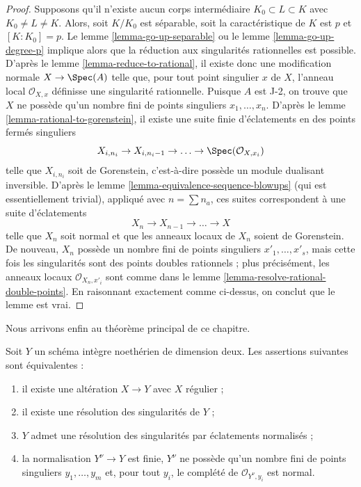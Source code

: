 \begin{proof}
\medskip\noindent Supposons qu'il n'existe aucun corps intermédiaire $K_0 \subset L \subset K$ avec $K_0 \not = L \not = K$. Alors, soit $K/K_0$ est séparable, soit la caractéristique de $K$ est $p$ et $[K : K_0] = p$. Le lemme \ref{lemma-go-up-separable} ou le lemme \ref{lemma-go-up-degree-p} implique alors que la réduction aux singularités rationnelles est possible. D'après le lemme \ref{lemma-reduce-to-rational}, il existe donc une modification normale $X \to \Spec(A)$ telle que, pour tout point singulier $x$ de $X$, l'anneau local $\mathcal{O}_{X, x}$ définisse une singularité rationnelle. Puisque $A$ est J-2, on trouve que $X$ ne possède qu'un nombre fini de points singuliers $x_1, \ldots, x_n$. D'après le lemme \ref{lemma-rational-to-gorenstein}, il existe une suite finie d'éclatements en des points fermés singuliers $$
X_{i, n_i} \to X_{i, n_i - 1} \to \ldots \to \Spec(\mathcal{O}_{X, x_i})
$$ telle que $X_{i, n_i}$ soit de Gorenstein, c'est-à-dire possède un module dualisant inversible. D'après le lemme \ref{lemma-equivalence-sequence-blowups} (qui est essentiellement trivial), appliqué avec $n = \sum n_a$, ces suites correspondent à une suite d'éclatements $$
X_n \to X_{n - 1} \to \ldots \to X
$$ telle que $X_n$ soit normal et que les anneaux locaux de $X_n$ soient de Gorenstein. De nouveau, $X_n$ possède un nombre fini de points singuliers $x'_1, \ldots, x'_s$, mais cette fois les singularités sont des points doubles rationnels ; plus précisément, les anneaux locaux $\mathcal{O}_{X_n, x'_i}$ sont comme dans le lemme \ref{lemma-resolve-rational-double-points}. En raisonnant exactement comme ci-dessus, on conclut que le lemme est vrai. \end{proof}

\noindent Nous arrivons enfin au théorème principal de ce chapitre.

\begin{theorem}[Lipman]
\label{theorem-resolve}
\begin{reference}
\cite[Theorem on page 151]{Lipman}
\end{reference}
Soit $Y$ un schéma intègre noethérien de dimension deux. Les assertions suivantes sont équivalentes :
\begin{enumerate}
\item il existe une altération $X \to Y$ avec $X$ régulier ;
\item il existe une résolution des singularités de $Y$ ;
\item $Y$ admet une résolution des singularités par éclatements normalisés ;
\item la normalisation $Y^\nu \to Y$ est finie, $Y^\nu$ ne possède qu'un nombre fini de points singuliers $y_1, \ldots, y_m$ et, pour tout $y_i$, le complété de $\mathcal{O}_{Y^\nu, y_i}$ est normal.
\end{enumerate}
\end{theorem}

